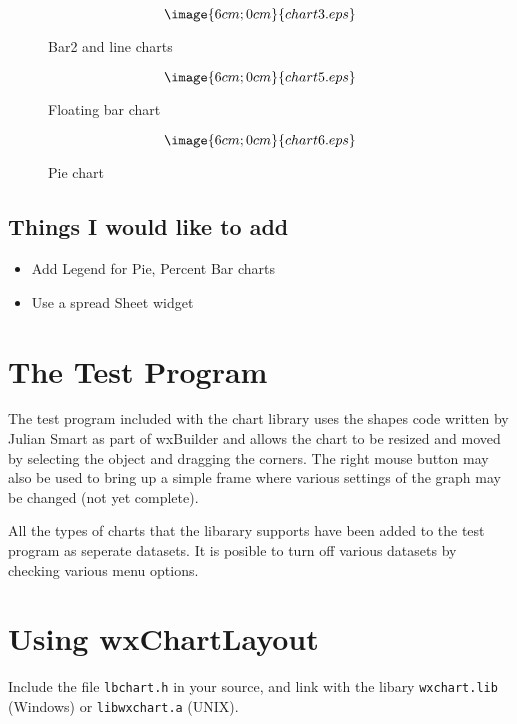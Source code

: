 \begin{figure}
$$\image{6cm;0cm}{chart3.eps}$$
\caption{Bar2 and line charts}
\end{figure}

\begin{figure}
$$\image{6cm;0cm}{chart5.eps}$$
\caption{Floating bar chart}
\end{figure}

\begin{figure}
$$\image{6cm;0cm}{chart6.eps}$$
\caption{Pie chart}
\end{figure}

\section{Things I would like to add}

\begin{itemize}\itemsep=0pt
\item Add Legend for Pie, Percent Bar charts
\item Use a spread Sheet widget
\end{itemize}

\chapter{The Test Program}
%
\setfooter{\thepage}{}{}{}{}{\thepage}

The test program included with the chart library uses the shapes code
written by Julian Smart as part of wxBuilder and allows the chart to be
resized and moved by selecting the object and dragging the corners. The
right mouse button may also be used to bring up a simple frame where
various settings of the graph may be changed (not yet complete). 

All the types of charts that the libarary supports have been added to
the test program as seperate datasets. It is posible to turn off various
datasets by checking various menu options. 

\chapter{Using wxChartLayout}%
%
\setfooter{\thepage}{}{}{}{}{\thepage}

Include the file {\tt lbchart.h} in your source, and link with the
libary {\tt wxchart.lib} (Windows) or {\tt libwxchart.a} (UNIX).






